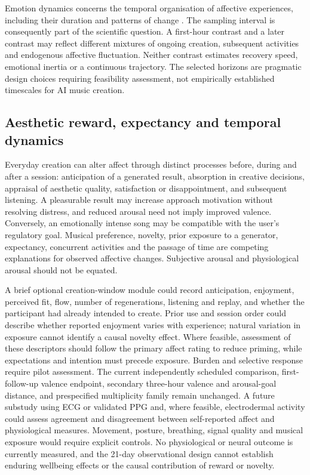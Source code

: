 \documentclass[11pt]{article}
\begin{document}
Emotion dynamics concerns the temporal organisation of affective experiences, including their duration and patterns of change \citep{kuppens2017}. The sampling interval is consequently part of the scientific question. A first-hour contrast and a later contrast may reflect different mixtures of ongoing creation, subsequent activities and endogenous affective fluctuation. Neither contrast estimates recovery speed, emotional inertia or a continuous trajectory. The selected horizons are pragmatic design choices requiring feasibility assessment, not empirically established timescales for AI music creation.

\subsection{Aesthetic reward, expectancy and temporal dynamics}
Everyday creation can alter affect through distinct processes before, during and after a session: anticipation of a generated result, absorption in creative decisions, appraisal of aesthetic quality, satisfaction or disappointment, and subsequent listening. A pleasurable result may increase approach motivation without resolving distress, and reduced arousal need not imply improved valence. Conversely, an emotionally intense song may be compatible with the user's regulatory goal. Musical preference, novelty, prior exposure to a generator, expectancy, concurrent activities and the passage of time are competing explanations for observed affective changes. Subjective arousal and physiological arousal should not be equated.

A brief optional creation-window module could record anticipation, enjoyment, perceived fit, flow, number of regenerations, listening and replay, and whether the participant had already intended to create. Prior use and session order could describe whether reported enjoyment varies with experience; natural variation in exposure cannot identify a causal novelty effect. Where feasible, assessment of these descriptors should follow the primary affect rating to reduce priming, while expectations and intention must precede exposure. Burden and selective response require pilot assessment. The current independently scheduled comparison, first-follow-up valence endpoint, secondary three-hour valence and arousal-goal distance, and prespecified multiplicity family remain unchanged. A future substudy using ECG or validated PPG and, where feasible, electrodermal activity could assess agreement and disagreement between self-reported affect and physiological measures. Movement, posture, breathing, signal quality and musical exposure would require explicit controls. No physiological or neural outcome is currently measured, and the 21-day observational design cannot establish enduring wellbeing effects or the causal contribution of reward or novelty.
\end{document}

